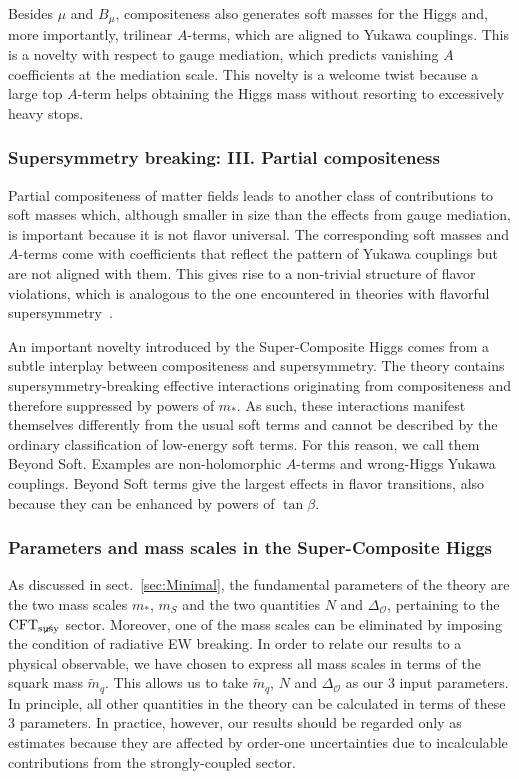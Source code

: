 \documentclass[a4paper,12pt]{article}
\def\sec#1{sect.~\ref{#1}}
\def\O{\mathcal{O}}
\def\mst{m_*}
\def\mS{m_S}
\def\CFTs{{\rm CFT}_ {{\rm susy}\! \! \! \! \! \! \! \!\diagup \,\,\,}}
\begin{document}
{{{{Besides $\mu$ and $B_\mu$, compositeness also generates soft masses for the Higgs and, more importantly, trilinear $A$-terms, which are aligned to Yukawa couplings. This is a novelty with respect to gauge mediation, which predicts vanishing $A$ coefficients at the mediation scale. This novelty is a welcome twist because a large top $A$-term helps obtaining the Higgs mass without resorting to excessively heavy stops.

\subsubsection*{Supersymmetry breaking: III. Partial compositeness}

Partial compositeness of matter fields leads to another class of contributions to soft masses which, although smaller in size than the effects from gauge mediation, is important because it is not flavor universal. The corresponding soft masses and $A$-terms come with coefficients that reflect the pattern of Yukawa couplings but are not aligned with them. This gives rise to a non-trivial structure of flavor violations, which is analogous to the one encountered in theories with flavorful supersymmetry~\cite{Nomura:2008pt}.

An important novelty introduced by the Super-Composite Higgs comes from a subtle interplay between compositeness and supersymmetry. The theory contains supersymmetry-breaking effective interactions originating from compositeness and therefore suppressed by powers of $\mst$. As such, these interactions manifest themselves differently from the usual soft terms and cannot be described by the ordinary classification of low-energy soft terms. For this reason, we call them Beyond Soft. Examples are non-holomorphic $A$-terms and wrong-Higgs Yukawa couplings. Beyond Soft terms give the largest effects in flavor transitions, also because they can be enhanced by powers of $\tan\beta$.

\subsubsection*{Parameters and mass scales in the Super-Composite Higgs}

As discussed in \sec{sec:Minimal}, the fundamental parameters of the theory are the two mass scales $\mst$, $\mS$ and the two quantities $N$ and $\Delta_\O$, pertaining to the $\CFTs$ sector. Moreover, one of the mass scales can be eliminated by imposing the condition of radiative EW breaking. In order to relate our results to a physical observable, we have chosen to express all mass scales in terms of the squark mass ${\tilde m}_q$. This allows us to take ${\tilde m}_q$, $N$ and $\Delta_\O$ as our 3 input parameters. In principle, all other quantities in the theory can be calculated in terms of these 3 parameters. In practice, however, our results should be regarded only as estimates because they are affected by order-one uncertainties due to incalculable contributions from the strongly-coupled sector.

}}}}
\end{document}
